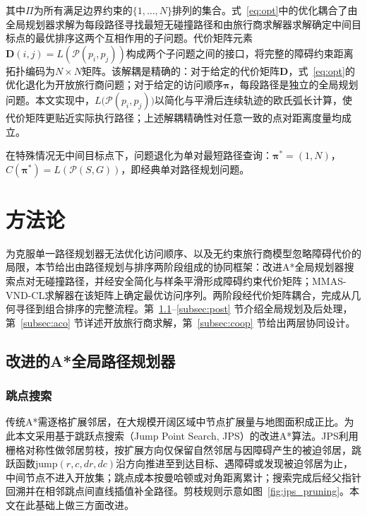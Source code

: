 \documentclass[lettersize,journal]{IEEEtran}
\begin{document}
其中$\Pi$为所有满足边界约束的$\{1, \dots, N\}$排列的集合。式~\textcolor{blue}{\eqref{eq:opt}}中的优化耦合了由全局规划器求解为每段路径寻找最短无碰撞路径和由旅行商求解器求解确定中间目标点的最优排序这两个互相作用的子问题。代价矩阵元素$\mathbf{D}(i, j) = L(\mathcal{P}(p_i, p_j))$构成两个子问题之间的接口，将完整的障碍约束距离拓扑编码为$N \times N$矩阵。该解耦是精确的：对于给定的代价矩阵$\mathbf{D}$，式~\textcolor{blue}{\eqref{eq:opt}}的优化退化为开放旅行商问题；对于给定的访问顺序$\bm{\pi}$，每段路径是独立的全局规划问题。本文实现中，$L\big(\mathcal{P}(p_i, p_j)\big)$以简化与平滑后连续轨迹的欧氏弧长计算，使代价矩阵更贴近实际执行路径；上述解耦精确性对任意一致的点对距离度量均成立。

在特殊情况无中间目标点下，问题退化为单对最短路径查询：$\bm{\pi}^{*} = (1, N)$，$C(\bm{\pi}^{*}) = L(\mathcal{P}(S, G))$，即经典单对路径规划问题。

\section{方法论}

\label{sec:method}

为克服单一路径规划器无法优化访问顺序、以及无约束旅行商模型忽略障碍代价的局限，本节给出由路径规划与排序两阶段组成的协同框架：改进A*全局规划器搜索点对无碰撞路径，并经安全简化与样条平滑形成障碍约束代价矩阵；MMAS-VND-CL求解器在该矩阵上确定最优访问序列。两阶段经代价矩阵耦合，完成从几何寻径到组合排序的完整流程。第~\textcolor{blue}{\ref{subsec:jps}}--\textcolor{blue}{\ref{subsec:post}} 节介绍全局规划及后处理，第~\textcolor{blue}{\ref{subsec:aco}} 节详述开放旅行商求解，第~\textcolor{blue}{\ref{subsec:coop}} 节给出两层协同设计。

\subsection{改进的A*全局路径规划器}

\label{subsec:jps}

\subsubsection{跳点搜索}

传统A*需逐格扩展邻居，在大规模开阔区域中节点扩展量与地图面积成正比。为此本文采用基于跳跃点搜索（Jump Point Search, JPS）的改进A*算法\textcolor{blue}{\cite{ref11,ref12}}。JPS利用栅格对称性做邻居剪枝，按扩展方向仅保留自然邻居与因障碍产生的被迫邻居，跳跃函数$\mathrm{jump}(r, c, dr, dc)$沿方向推进至到达目标、遇障碍或发现被迫邻居为止，中间节点不进入开放集；跳点成本按曼哈顿或对角距离累计；搜索完成后经父指针回溯并在相邻跳点间直线插值补全路径。剪枝规则示意如图~\textcolor{blue}{\ref{fig:jps_pruning}}。本文在此基础上做三方面改进。
\end{document}
